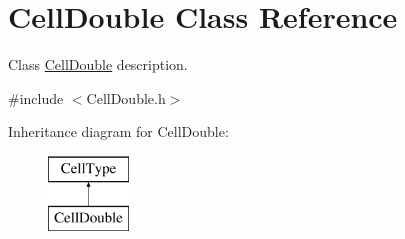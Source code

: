 \hypertarget{class_cell_double}{}\section{Cell\+Double Class Reference}
\label{class_cell_double}


Class \hyperlink{class_cell_double}{Cell\+Double} description.  




{\ttfamily \#include $<$Cell\+Double.\+h$>$}

Inheritance diagram for Cell\+Double\+:\begin{figure}[H]
\begin{center}
\leavevmode
\includegraphics[height=2.000000cm]{class_cell_double}
\end{center}
\end{figure}
